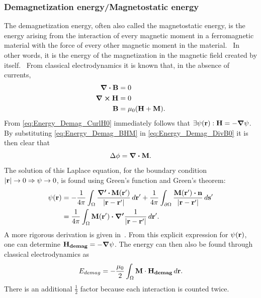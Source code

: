 \documentclass[10pt,a4paper]{article}
\begin{document}
\subsubsection{Demagnetization energy/Magnetostatic energy}
The demagnetization energy, often also called the magnetostatic energy, is the energy arising from the interaction of every magnetic moment in a ferromagnetic material with the force of every other magnetic moment in the material.~\cite{NML_Carlton} In other words, it is the energy of the magnetization in the magnetic field created by itself.~\cite{abert2013discrete}
From classical electrodynamics it is known that, in the absence of currents,
\begin{align}
	\div{\vb{B}} &= 0 \label{eq:Energy_Demag_DivB0} \\
	\curl{\vb{H}} &= 0 \label{eq:Energy_Demag_CurlH0} \\
	\vb{B} &= \mu_0 (\vb{H} + \vb{M}) \label{eq:Energy_Demag_BHM} \mathrm{.}
\end{align}
From \cref{eq:Energy_Demag_CurlH0} immediately follows that $\exists \psi(\vb{r}): \vb{H} = -\gradient{\psi}$. By substituting \cref{eq:Energy_Demag_BHM} in \cref{eq:Energy_Demag_DivB0} it is then clear that
\begin{equation}
    \Delta \phi = \div{\vb{M}} \mathrm{.}
\end{equation}
The solution of this Laplace equation, for the boundary condition $\abs{\vb{r}} \rightarrow 0 \Rightarrow \psi \rightarrow 0$, is found using Green's function and Green's theorem:
\begin{align*}
    \psi(\vb{r}) &= -\frac{1}{4\pi}\int_\Omega \frac{\boldsymbol{\nabla'\,\vdot}\,\vb{M}(\vb{r'})}{\abs{\vb{r}-\vb{r'}}} \,d\vb{r'} + \frac{1}{4\pi}\int_{\partial\Omega} \frac{\vb{M}(\vb{r'}) \vdot \vb{n}}{\abs{\vb{r}-\vb{r'}}} \,d\vb{s'} \\
    &= \frac{1}{4\pi}\int_\Omega \vb{M}(\vb{r'}) \vdot \boldsymbol{\nabla'} \frac{1}{\abs{\vb{r}-\vb{r'}}} \,d\vb{r'} \mathrm{.}
\end{align*}
A more rigorous derivation is given in~\cite{abert2013discrete}.
From this explicit expression for $\psi(\vb{r})$, one can determine $\vb{H_{demag}} = -\gradient{\psi}$. The energy can then also be found through classical electrodynamics as
\begin{equation}
    E_{demag} = -\frac{\mu_0}{2} \int_\Omega \vb{M} \cdot \vb{H_{demag}} \, d\vb{r} \mathrm{.} \label{eq:Energy_Term_Demag}
\end{equation}
There is an additional $\frac{1}{2}$ factor because each interaction is counted twice.
\end{document}
